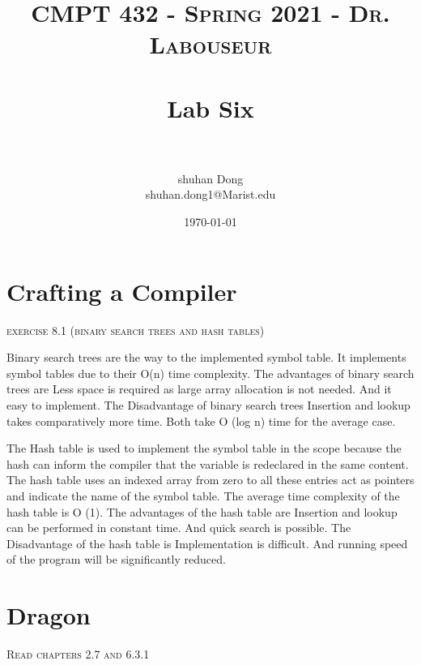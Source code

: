 \documentclass[letterpaper, 10pt,DIV=13]{scrartcl}
\title{	
   \normalfont \normalsize 
   \textsc{CMPT 432 - Spring 2021 - Dr. Labouseur} \\[10pt] %
   \horrule{0.5pt} \\[0.25cm] 	%
   \huge Lab Six  \\     	    %
   \horrule{0.5pt} \\[0.25cm] 	%
}
\author{shuhan Dong \\ \normalsize  shuhan.dong1@Marist.edu}
\date{\normalsize\today} 	%
\numberwithin{equation}{section} %
\numberwithin{figure}{section} %
\numberwithin{table}{section} %
\begin{document}
\maketitle %

\section{Crafting a Compiler}


\textsc{exercise 8.1	(binary	search trees and hash tables)		}

Binary search trees are the way to the implemented symbol table. It implements symbol tables due to their O(n) time complexity. The advantages of binary search trees are Less space is required as large array allocation is not needed. And it easy to implement. The Disadvantage of binary search trees Insertion and lookup takes comparatively more time. Both take O (log n) time for the average case.

The Hash table is used to implement the symbol table in the scope because the hash can inform the compiler that the variable is redeclared in the same content. The hash table uses an indexed array from zero to all these entries act as pointers and indicate the name of the symbol table. The average time complexity of the hash table is O (1). The advantages of the hash table are Insertion and lookup can be performed in constant time. And quick search is possible. The Disadvantage of the hash table is Implementation is difficult. And running speed of the program will be significantly reduced.













\section{Dragon}

\textsc{ Read chapters 2.7 and 6.3.1}
\end{document}
